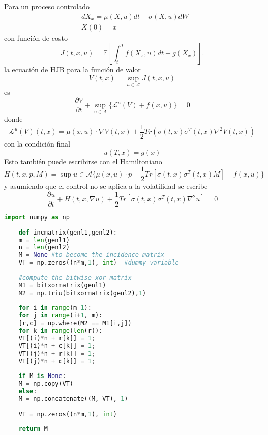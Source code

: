 \documentclass{article}
\newcommand{\dpartial}[2]{\frac{\partial #1}{\partial #2}}
\newenvironment{recordar}[1][Recordar]
{\begin{tcolorbox}[breakable,colback=red!10!white,colframe=red!50!blue,title=Recordar: #1 ,enhanced jigsaw]
	
}{\end{tcolorbox}}
\begin{document}
\begin{recordar}[Hamilton-Jacobi-Bellman]
	Para un proceso controlado
	\begin{equation*}
		\begin{split}
			&dX_x=\mu(X,u)dt+\sigma(X,u)dW\\
			&X(0)=x
		\end{split}
	\end{equation*}
con función de costo
\begin{equation*}
	J(t,x,u)=\mathbb{E}\left[\int_{t}^{T}f(X_x,u) dt +g(X_x)\right].
\end{equation*}
la ecuación de HJB para la función de valor
\begin{equation*}
	V(t,x)=\sup_{u\in \mathcal{A}}J(t,x,u)
\end{equation*}
es
\begin{equation*}
	\dpartial{V}{t}+\sup_{u\in A}\{ \mathcal{L}^{u}(V)+f(x,u)\}=0
\end{equation*}
donde 
\begin{equation*}
	\mathcal{L}^{u}(V)(t,x)=\mu(x,u)\cdot \nabla V(t,x) +\frac{1}{2}Tr(\sigma(t,x)\sigma^{T}(t,x)\nabla^2 V(t,x))
\end{equation*}
con la condición final
\begin{equation*}
	u(T,x)=g(x)
\end{equation*}
Esto también puede escribirse con el Hamiltoniano
	\begin{equation*}
		H(t,x,p,M)=\sup{u\in \mathcal{A}}\{\mu(x,u)\cdot p+\frac{1}{2}Tr[\sigma(t,x)\sigma^{T}(t,x)M]+f(x,u)\}
	\end{equation*}
y asumiendo que el control no se aplica a la volatilidad se escribe
\begin{equation*}
	\dpartial{u}{t}+H(t,x,\nabla u)+\frac{1}{2}Tr[\sigma(t,x)\sigma^{T}(t,x)\nabla^2 u]=0
\end{equation*}

\end{recordar}


\begin{lstlisting}[language=Python]
	import numpy as np
	
	def incmatrix(genl1,genl2):
	m = len(genl1)
	n = len(genl2)
	M = None #to become the incidence matrix
	VT = np.zeros((n*m,1), int)  #dummy variable
	
	#compute the bitwise xor matrix
	M1 = bitxormatrix(genl1)
	M2 = np.triu(bitxormatrix(genl2),1) 
	
	for i in range(m-1):
	for j in range(i+1, m):
	[r,c] = np.where(M2 == M1[i,j])
	for k in range(len(r)):
	VT[(i)*n + r[k]] = 1;
	VT[(i)*n + c[k]] = 1;
	VT[(j)*n + r[k]] = 1;
	VT[(j)*n + c[k]] = 1;
	
	if M is None:
	M = np.copy(VT)
	else:
	M = np.concatenate((M, VT), 1)
	
	VT = np.zeros((n*m,1), int)
	
	return M
\end{lstlisting}
\printbibliography
\end{document}
